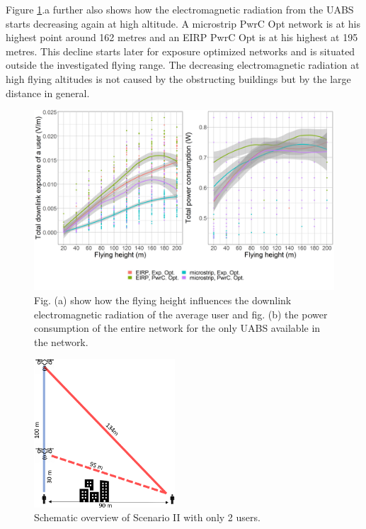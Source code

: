 Figure \ref{fig:s2a_dlAndPc}.a further also shows how the electromagnetic radiation from the \gls{UABS}
starts  decreasing again at high altitude. A microstrip \gls{PwrC Opt} network is at his highest point  
around 162 metres and an \gls{EIRP} \gls{PwrC Opt} is at his highest at 195 metres.
This decline starts later for exposure optimized networks and is situated outside the investigated flying range.
The decreasing electromagnetic radiation at high flying altitudes is not caused by the obstructing buildings but by the 
large distance in general.


\begin{figure}[h!]
  \includegraphics[width=\textwidth]{../results/s2/fhvsdlAndPc.png}
  \caption{Fig. (a) show how the flying height influences the downlink electromagnetic radiation of the average user and fig. (b) the
  power consumption of the entire network for the only \acs{UABS} available in the network.}
  \label{fig:s2a_dlAndPc}
\end{figure}

\FloatBarrier
\begin{figure}
\vspace{-1.2cm}
  \begin{center}
    \includegraphics[width=0.47\textwidth]{../results/s2/proveScenario.png}
  \end{center}
  \caption{Schematic overview of Scenario II with only 2 users.}
  \label{fig:schematicprove}
\end{figure}

